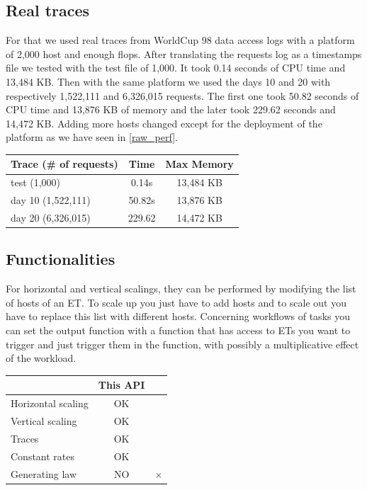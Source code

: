 \documentclass[a4paper, onecolumn]{article}
\begin{document}
       
  \subsection{Real traces}
    For that we used real traces from WorldCup 98 data access logs \cite{wc98}
    with a platform of 2,000 host and enough flops. After translating the
    requests log as a timestamps file we tested with the test file of 1,000. It
    took 0.14 seconds of CPU time and 13,484 KB. Then with the same platform we
    used the days 10 and 20 with respectively 1,522,111 and 6,326,015 requests.
    The first one took 50.82 seconds of CPU time and 13,876 KB of memory and
    the later took 229.62 seconds and 14,472 KB. Adding more hosts changed 
    except for the deployment of the platform as we have seen in \ref{raw_perf}.
    
    \begin{center}
     	\begin{tabular}{| l | c | c |}
     		\hline
     		Trace (\# of requests) & Time & Max Memory\\ 
     		\hline
     		test (1,000) & 0.14s & 13,484 KB\\
	        \hline
	        day 10 (1,522,111) & 50.82s & 13,876 KB\\
	        \hline
	        day 20 (6,326,015) & 229.62 & 14,472 KB\\
     		\hline
     	\end{tabular}
    \end{center}
  
  \subsection{Functionalities}
   For horizontal and vertical scalings, they can be performed by modifying the 
   list of hosts of an ET. To scale up you just have to add hosts and to scale 
   out you have to replace this list with different hosts. Concerning workflows 
   of tasks you can set the output function with a function that has access to 
   ETs you want to trigger and just trigger them in the function, with possibly 
   a multiplicative effect of the workload.
   
   \begin{center}
   	\begin{tabular}{| l | c | c |}
   		\hline
   		& This API & \cite{vasic2012dejavu}\\ 
   		\hline\hline
   		Horizontal scaling & OK & \checkmark\\
   		\hline
   		Vertical scaling & OK & \checkmark\\
   		\hline\hline
   		Traces & OK & \\
   		\hline
   		Constant rates & OK & \\
   		\hline
   		Generating law & NO & $\times$ \\
   		\hline
   	\end{tabular}
   \end{center}
  
\end{document}
